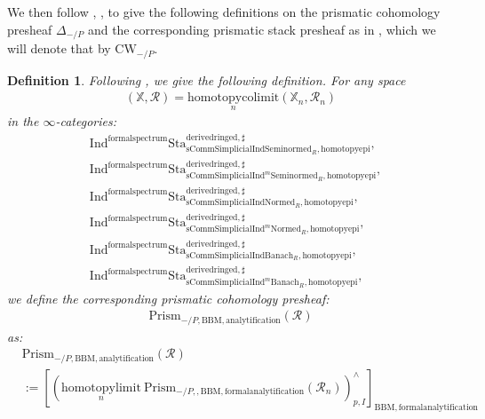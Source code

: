 \documentclass[12pt]{book}
\newtheorem{definition}{Definition}
\begin{document}
\indent We then follow \cite{BS}, \cite{BL}, \cite{Dr1} to give the following definitions on the prismatic cohomology presheaf $\Delta_{-/P}$ and the corresponding prismatic stack presheaf as in \cite{BL}, which we will denote that by $\mathrm{CW}_{-/P}$.



\begin{definition}
Following \cite[Construction 7.6]{BS}, \cite[Definition 3.1, Variant 5.1]{BL} we give the following definition. For any space
\begin{align}
(\mathbb{X},\mathcal{R})=\underset{n}{\mathrm{homotopycolimit}}(\mathbb{X}_n,\mathcal{R}_n)	
\end{align}
in the $\infty$-categories:
\begin{align}
&\mathrm{Ind}^\mathrm{formalspectrum}\mathrm{Sta}^\mathrm{derivedringed,\sharp}_{\mathrm{sComm}\mathrm{Simplicial}\mathrm{Ind}\mathrm{Seminormed}_R,\mathrm{homotopyepi}},\\
&\mathrm{Ind}^\mathrm{formalspectrum}\mathrm{Sta}^\mathrm{derivedringed,\sharp}_{\mathrm{sComm}\mathrm{Simplicial}\mathrm{Ind}^m\mathrm{Seminormed}_R,\mathrm{homotopyepi}},\\
&\mathrm{Ind}^\mathrm{formalspectrum}\mathrm{Sta}^\mathrm{derivedringed,\sharp}_{\mathrm{sComm}\mathrm{Simplicial}\mathrm{Ind}\mathrm{Normed}_R,\mathrm{homotopyepi}},\\
&\mathrm{Ind}^\mathrm{formalspectrum}\mathrm{Sta}^\mathrm{derivedringed,\sharp}_{\mathrm{sComm}\mathrm{Simplicial}\mathrm{Ind}^m\mathrm{Normed}_R,\mathrm{homotopyepi}},\\
&\mathrm{Ind}^\mathrm{formalspectrum}\mathrm{Sta}^\mathrm{derivedringed,\sharp}_{\mathrm{sComm}\mathrm{Simplicial}\mathrm{Ind}\mathrm{Banach}_R,\mathrm{homotopyepi}},\\
&\mathrm{Ind}^\mathrm{formalspectrum}\mathrm{Sta}^\mathrm{derivedringed,\sharp}_{\mathrm{sComm}\mathrm{Simplicial}\mathrm{Ind}^m\mathrm{Banach}_R,\mathrm{homotopyepi}},	
\end{align}
we define the corresponding prismatic cohomology presheaf:
\begin{align}
\mathrm{Prism}_{-/P,\mathrm{BBM},\mathrm{analytification}}(\mathcal{R})
\end{align}
as:
\begin{align}
&\mathrm{Prism}_{-/P,\mathrm{BBM},\mathrm{analytification}}(\mathcal{R})\\
&:=[(\underset{n}{\mathrm{homotopylimit}}~ \mathrm{Prism}_{-/P,,\mathrm{BBM},\mathrm{formalanalytification}}(\mathcal{R}_n))^\wedge_{p,I}]_{\mathrm{BBM},\mathrm{formalanalytification}}	

\end{align}
\end{definition}
\end{document}
